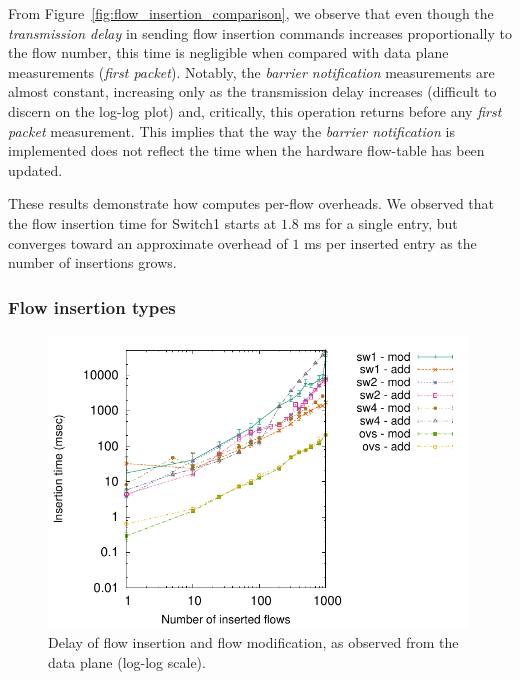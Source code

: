 From Figure~\ref{fig:flow_insertion_comparison}, we observe that even though the
\textit{transmission delay} in sending flow insertion commands increases
proportionally to the flow number, this time is negligible when compared with
data plane measurements (\textit{first packet}). Notably, the \textit{barrier
  notification} measurements are almost constant, increasing only as the
transmission delay increases (difficult to discern on the log-log plot) and,
critically, this operation returns before any \textit{first packet} measurement.
This implies that the way the \textit{barrier notification} is implemented does
not reflect the time when the hardware flow-table has been updated.

These results demonstrate how \oflops computes per-flow overheads. We
observed that the flow insertion time for Switch1 starts at $1.8$ ms for a single
entry, but converges toward an approximate overhead of $1$ ms per inserted entry
as the number of insertions grows.

\subsubsection*{Flow insertion types}

\begin{figure}[h]
  \begin{center}
    \includegraphics[width=0.99\textwidth]{Chapter1/Chapter1Figs/flow_insertion_delay}
  \end{center}
  \caption[Delay of flow insertion and flow modification]{Delay of flow insertion 
  and flow modification, as observed from the data plane (log-log scale).}
  \label{fig:flow_insertion_delay}
\end{figure}

